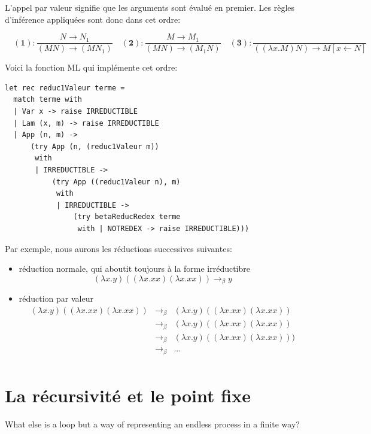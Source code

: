 \documentclass[11pt]{book}
\begin{document}
L'appel par valeur signifie que les arguments sont évalué en premier. Les règles d'inférence appliquées sont donc dans cet ordre:

$$
\quad \mathbf{(1)} : \frac{N \rightarrow N_1}{(M N) \rightarrow (M N_1)}
\quad \mathbf{(2)} : \frac{M \rightarrow M_1}{(M N) \rightarrow (M_1 N)}
\quad \mathbf{(3)} : \frac{}{((\lambda x.M)N) \rightarrow M[x \leftarrow N]} 
$$

Voici la fonction ML qui implémente cet ordre:
\begin{Verbatim}
let rec reduc1Valeur terme =
  match terme with
  | Var x -> raise IRREDUCTIBLE
  | Lam (x, m) -> raise IRREDUCTIBLE
  | App (n, m) ->
      (try App (n, (reduc1Valeur m))
       with
       | IRREDUCTIBLE ->
           (try App ((reduc1Valeur n), m)
            with
            | IRREDUCTIBLE ->
                (try betaReducRedex terme
                 with | NOTREDEX -> raise IRREDUCTIBLE)))
\end{Verbatim}

Par exemple, nous aurons les réductions successives suivantes: 

\begin{itemize}
\item réduction normale, qui aboutit toujours à la forme irréductibre
$$ (\lambda x.y) ((\lambda x.xx) (\lambda x.xx)) \rightarrow_\beta y $$ 

\item réduction par valeur 
$$
\begin{array}{ccc}
 (\lambda x.y)((\lambda x.xx) (\lambda x.xx)) &  \rightarrow_\beta  & (\lambda x.y)((\lambda x.xx) (\lambda x.xx))\\ 
 & \rightarrow_\beta  & (\lambda x.y)((\lambda x.xx) (\lambda x.xx)) \\
 &\rightarrow_\beta  & (\lambda x.y)((\lambda x.xx) (\lambda x.xx))) \\
 & \rightarrow_\beta  & \ldots \\
\end{array}
$$
\end{itemize}

\section{La récursivité et le point fixe}

What else is a loop but a way of representing an endless process in a finite way?
\cite{god}
\end{document}
